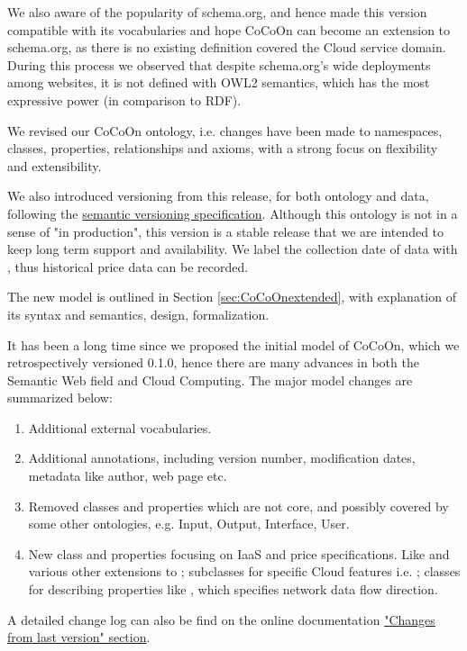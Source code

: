We also aware of the popularity of schema.org, and hence made this version compatible with its vocabularies and hope CoCoOn can become an extension to schema.org, as there is no existing definition covered the Cloud service domain. During this process we observed that despite schema.org's wide deployments among websites, it is not defined with OWL2 semantics, which has the most expressive power (in comparison to RDF).

We revised our CoCoOn ontology, i.e. changes have been made to namespaces, classes, properties, relationships and axioms, with a strong focus on flexibility and extensibility.

We also introduced versioning from this release, for both ontology and data, following the
\href{https://semver.org/}{semantic versioning specification}. Although this ontology is not in a sense of "in production",
this version is a stable release that we are intended to keep long term support and availability. We label the collection date of data with , thus historical price data can be recorded.

The new model is outlined in Section \ref{sec:CoCoOnextended},
with explanation of its syntax and semantics, design, formalization.

It has been a long time since we proposed the initial model of CoCoOn, which we retrospectively versioned 0.1.0, hence there are many advances in both the Semantic Web field and Cloud Computing.
The major model changes are summarized below:
\begin{enumerate}
  \item Additional external vocabularies.
  \item Additional annotations, including version number, modification dates, metadata like author,
  web page etc.
  \item Removed classes and properties which are not core, and possibly covered by some other ontologies, e.g. Input, Output, Interface, User.
  \item New class and properties focusing on IaaS and price specifications. Like  and various other extensions to ; subclasses for specific Cloud features i.e. ; classes for describing properties like , which specifies network data flow direction.
\end{enumerate}
A detailed change log can also be find on the online documentation 
\href{https://w3id.org/cocoon/v1.0.1#changes}{"Changes from last version" section}.

